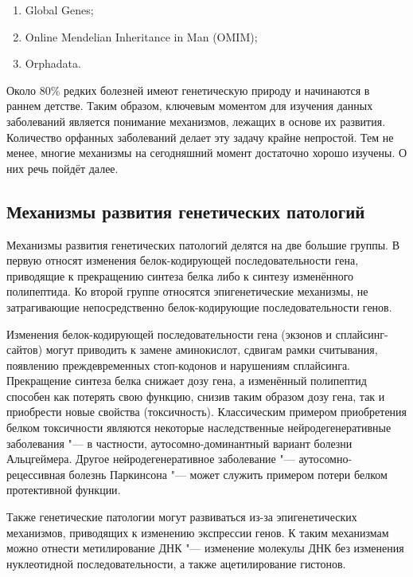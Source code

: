 \documentclass[a4paper,12pt]{article}
\begin{document}
\begin{enumerate}
\item Global Genes;
\item Online Mendelian Inheritance in Man (OMIM)\cite{omim};
\item Orphadata.
\end{enumerate}

Около 80\% редких болезней имеют генетическую природу и начинаются в раннем детстве\cite{lancet}.
Таким образом, ключевым моментом для изучения данных заболеваний является понимание механизмов, лежащих в основе их развития.
Количество орфанных заболеваний делает эту задачу крайне непростой.
Тем не менее, многие механизмы на сегодняшний момент достаточно хорошо изучены.
О них речь пойдёт далее.

\subsection{Механизмы развития генетических патологий}

Механизмы развития генетических патологий делятся на две большие группы.
В первую относят изменения белок-кодирующей последовательности гена, приводящие к прекращению синтеза белка либо к синтезу изменённого полипептида.
Ко второй группе относятся эпигенетические механизмы, не затрагивающие непосредственно белок-кодирующие последовательности генов.

Изменения белок-кодирующей последовательности гена (экзонов и сплайсинг-сайтов) могут приводить к замене аминокислот, сдвигам рамки считывания, появлению преждевременных стоп-кодонов и нарушениям сплайсинга.
Прекращение синтеза белка снижает дозу гена, а изменённый полипептид способен как потерять свою функцию, снизив таким образом дозу гена, так и приобрести новые свойства (токсичность).
Классическим примером приобретения белком токсичности являются некоторые наследственные нейродегенеративные заболевания "--- в частности, аутосомно-доминантный вариант болезни Альцгеймера.
Другое нейродегенеративное заболевание "--- аутосомно-рецессивная болезнь Паркинсона "--- может служить примером потери белком протективной функции\cite{winklhofer}.

Также генетические патологии могут развиваться из-за эпигенетических механизмов, приводящих к изменению экспрессии генов.
К таким механизмам можно отнести метилирование ДНК "--- изменение молекулы ДНК без изменения нуклеотидной последовательности, а также ацетилирование гистонов.
\end{document}

